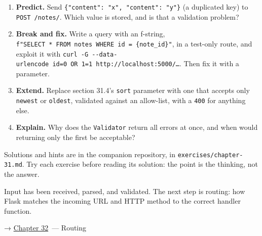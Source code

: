 \begin{enumerate}
\def\labelenumi{\arabic{enumi}.}
\tightlist
\item
  \textbf{Predict.} Send \texttt{\{"content":}\allowbreak{}\texttt{\ "x",}\allowbreak{}\texttt{\ "content":}\allowbreak{}\texttt{\ "y"\}} (a duplicated key) to \texttt{POST\ /notes/}. Which value is stored, and is that a validation problem?
\item
  \textbf{Break and fix.} Write a query with an f-string, \texttt{f"SELECT\ *\ FROM\ notes\ WHERE\ id\ =}\allowbreak{}\texttt{\ \{note\_}\allowbreak{}\texttt{id\}"}, in a test-only route, and exploit it with \texttt{curl\ -}\allowbreak{}\texttt{G\ -}\allowbreak{}\texttt{-}\allowbreak{}\texttt{data-}\allowbreak{}\texttt{urlencode\ \textquotesingle{}id=}\allowbreak{}\texttt{0\ OR\ 1=}\allowbreak{}\texttt{1\textquotesingle{}\ http:}\allowbreak{}\texttt{/}\allowbreak{}\texttt{/}\allowbreak{}\texttt{localhost:}\allowbreak{}\texttt{5000/}\allowbreak{}\texttt{…}. Then fix it with a parameter.
\item
  \textbf{Extend.} Replace section 31.4's \texttt{sort} parameter with one that accepts only \texttt{newest} or \texttt{oldest}, validated against an allow-list, with a \texttt{400} for anything else.
\item
  \textbf{Explain.} Why does the \texttt{Validator} return all errors at once, and when would returning only the first be acceptable?
\end{enumerate}

\noindent{}Solutions and hints are in the companion repository, in \texttt{exercises/}\allowbreak{}\texttt{chapter-31.md}. Try each exercise before reading its solution: the point is the thinking, not the answer.

\label{31-input-handling:whats-next}

Input has been received, parsed, and validated. The next step is routing: how Flask matches the incoming URL and HTTP method to the correct handler function.

\noindent{}→ \hyperref[ch:32-routing]{Chapter 32}~--- Routing
